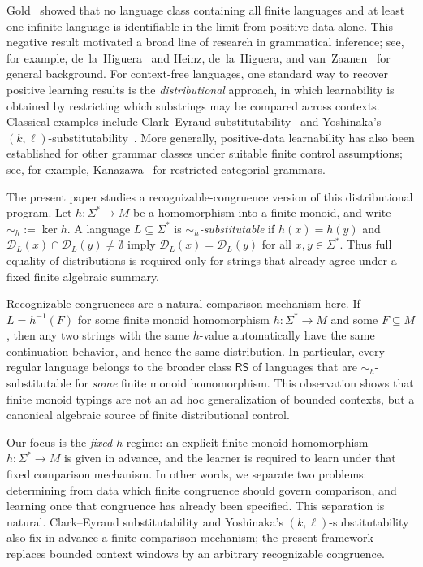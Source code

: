 \documentclass[11pt,a4paper]{article}
\newcommand{\D}{\mathcal{D}}
\begin{document}
Gold~\cite{gold1967} showed that no language class containing all finite
languages and at least one infinite language is identifiable in the limit
from positive data alone. This negative result motivated a broad line of
research in grammatical inference; see, for example,
de~la~Higuera~\cite{higuera2010} and
Heinz, de~la~Higuera, and van~Zaanen~\cite{heinz-higuera-zaanen2011}
for general background. For context-free languages, one standard way to
recover positive learning results is the \emph{distributional} approach,
in which learnability is obtained by restricting which substrings may be
compared across contexts. Classical examples include Clark--Eyraud
substitutability~\cite{clark-eyraud2007} and Yoshinaka's
$(k,\ell)$-substitutability~\cite{yoshinaka2008}. More generally,
positive-data learnability has also been established for other grammar
classes under suitable finite control assumptions; see, for example,
Kanazawa~\cite{kanazawa1998} for restricted categorial grammars.

The present paper studies a recognizable-congruence version of this
distributional program. Let $h:\Sigma^*\to M$ be a homomorphism into a
finite monoid, and write $\sim_h:=\ker h$. A language $L\subseteq\Sigma^*$
is \emph{$\sim_h$-substitutable} if $h(x)=h(y)$ and
$\D_L(x)\cap\D_L(y)\neq\emptyset$ imply $\D_L(x)=\D_L(y)$ for all
$x,y\in\Sigma^*$. Thus full equality of distributions is required only
for strings that already agree under a fixed finite algebraic summary.

Recognizable congruences are a natural comparison mechanism here. If
$L=h^{-1}(F)$ for some finite monoid homomorphism $h:\Sigma^*\to M$ and
some $F\subseteq M$, then any two strings with the same $h$-value
automatically have the same continuation behavior, and hence the same
distribution. In particular, every regular language belongs to the broader
class $\mathsf{RS}$ of languages that are $\sim_h$-substitutable for
\emph{some} finite monoid homomorphism. This observation shows that finite
monoid typings are not an ad hoc generalization of bounded contexts, but a
canonical algebraic source of finite distributional control.

Our focus is the \emph{fixed-$h$} regime: an explicit finite monoid
homomorphism $h:\Sigma^*\to M$ is given in advance, and the learner is
required to learn under that fixed comparison mechanism. In other words,
we separate two problems: determining from data which finite congruence
should govern comparison, and learning once that congruence has already
been specified. This separation is natural. Clark--Eyraud substitutability
and Yoshinaka's $(k,\ell)$-substitutability also fix in advance a finite
comparison mechanism; the present framework replaces bounded context
windows by an arbitrary recognizable congruence.
\end{document}
